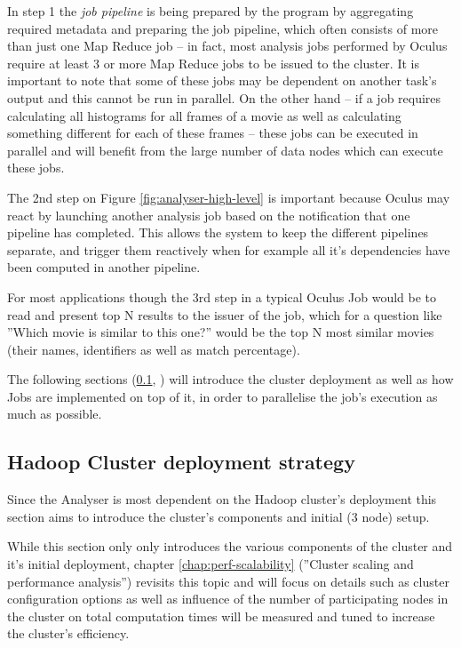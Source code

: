 In step 1 the \textit{job pipeline} is being prepared by the program by aggregating required metadata and preparing the job pipeline, which often consists of more than just one Map Reduce job -- in fact, most analysis jobs performed by Oculus require at least 3 or more Map Reduce jobs to be issued to the cluster. It is important to note that some of these jobs may be dependent on another task's output and this cannot be run in parallel. On the other hand -- if a job requires calculating all histograms for all frames of a movie as well as calculating something different for each of these frames -- these jobs can be executed in parallel and will benefit from the large number of data nodes which can execute these jobs.

The 2nd step on Figure \ref{fig:analyser-high-level} is important because Oculus may react by launching another analysis job based on the notification that one pipeline has completed. This allows the system to keep the different pipelines separate, and trigger them reactively when for example all it's dependencies have been computed in another pipeline.

For most applications though the 3rd step in a typical Oculus Job would be to read and present top N results to the issuer of the job, which for a question like ''Which movie is similar to this one?'' would be the top N most similar movies (their names, identifiers as well as match percentage).

The following sections (\ref{sec:deployment-strategy}, \label{sec:scalding-jobs}) will introduce the cluster deployment as well as how Jobs are implemented on top of it, in order to parallelise the job's execution as much as possible.



\subsection{Hadoop Cluster deployment strategy}
\label{sec:deployment-strategy}

Since the Analyser is most dependent on the Hadoop cluster's deployment this section aims to introduce the cluster's components and initial (3 node) setup. 

While this section only only introduces the various components of the cluster and it's initial deployment, chapter \ref{chap:perf-scalability} (''Cluster scaling and performance analysis'') revisits this topic and will focus on details such as cluster configuration options as well as influence of the number of participating nodes in the cluster on total computation times will be measured and tuned to increase the cluster's efficiency.

